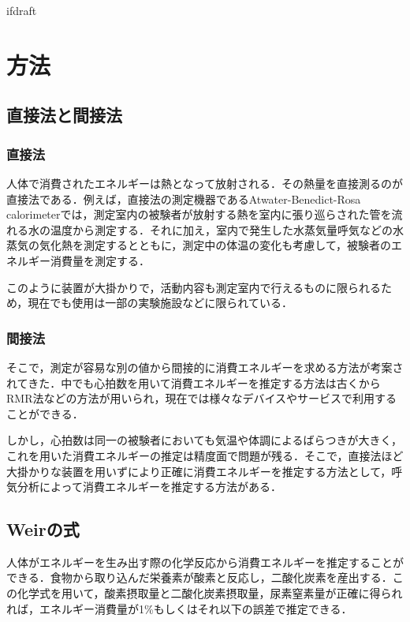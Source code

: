 \expandafter\ifx\csname ifdraft\endcsname\relax
 
\fi

\section{方法}
\label{sec:method}

\subsection{直接法と間接法}

\subsubsection{直接法}

人体で消費されたエネルギーは熱となって放射される．その熱量を直接測るのが直接法である．例えば，直接法の測定機器であるAtwater-Benedict-Rosa calorimeterでは，測定室内の被験者が放射する熱を室内に張り巡らされた管を流れる水の温度から測定する．それに加え，室内で発生した水蒸気量呼気などの水蒸気の気化熱を測定するとともに，測定中の体温の変化も考慮して，被験者のエネルギー消費量を測定する\cite{tanaka_2006}．

このように装置が大掛かりで，活動内容も測定室内で行えるものに限られるため，現在でも使用は一部の実験施設などに限られている．

\subsubsection{間接法}

そこで，測定が容易な別の値から間接的に消費エネルギーを求める方法が考案されてきた．中でも心拍数を用いて消費エネルギーを推定する方法は古くからRMR法などの方法が用いられ\cite{usutani_1990}，現在では様々なデバイスやサービスで利用することができる．

しかし，心拍数は同一の被験者においても気温や体調によるばらつきが大きく，これを用いた消費エネルギーの推定は精度面で問題が残る．そこで，直接法ほど大掛かりな装置を用いずにより正確に消費エネルギーを推定する方法として，呼気分析によって消費エネルギーを推定する方法がある．

\subsection{Weirの式}
人体がエネルギーを生み出す際の化学反応から消費エネルギーを推定することができる．食物から取り込んだ栄養素が酸素と反応し，二酸化炭素を産出する．この化学式を用いて，酸素摂取量と二酸化炭素摂取量，尿素窒素量が正確に得られれば，エネルギー消費量が1\%もしくはそれ以下の誤差で推定できる\cite{livesey_1988}．

